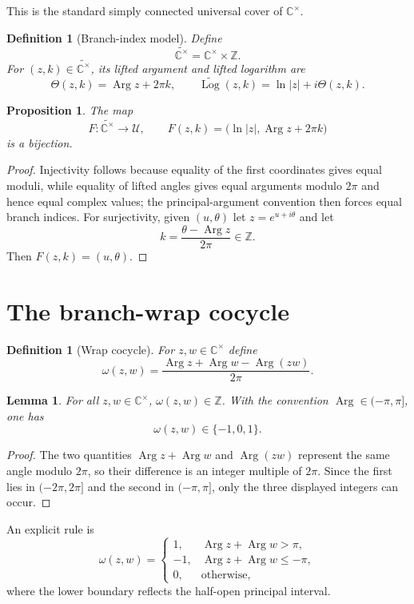 \documentclass[11pt]{article}
\newtheorem{proposition}[theorem]{Proposition}
\newtheorem{lemma}[theorem]{Lemma}
\newtheorem{definition}[theorem]{Definition}
\newcommand{\C}{\mathbb C}
\newcommand{\Z}{\mathbb Z}
\newcommand{\Argp}{\operatorname{Arg}}
\newcommand{\wtC}{\widetilde{\C^{\times}}}
\begin{document}
This is the standard simply connected universal cover of $\C^{\times}$.

\begin{definition}[Branch-index model]
Define
\[
\wtC=\C^{\times}\times\Z.
\]
For $(z,k)\in\wtC$, its lifted argument and lifted logarithm are
\[
\Theta(z,k)=\Argp z+2\pi k,
\qquad
\widetilde{\operatorname{Log}}(z,k)=\ln|z|+i\Theta(z,k).
\]
\end{definition}

\begin{proposition}
The map
\[
F:\wtC\longrightarrow\mathcal U,
\qquad
F(z,k)=\bigl(\ln|z|,\Argp z+2\pi k\bigr)
\]
is a bijection.
\end{proposition}

\begin{proof}
Injectivity follows because equality of the first coordinates gives equal moduli, while equality of lifted angles gives equal arguments modulo $2\pi$ and hence equal complex values; the principal-argument convention then forces equal branch indices.  For surjectivity, given $(u,\theta)$ let $z=e^{u+i\theta}$ and let
\[
k=\frac{\theta-\Argp z}{2\pi}\in\Z.
\]
Then $F(z,k)=(u,\theta)$.
\end{proof}

\section{The branch-wrap cocycle}

\begin{definition}[Wrap cocycle]
For $z,w\in\C^{\times}$ define
\[
\omega(z,w)=\frac{\Argp z+\Argp w-\Argp(zw)}{2\pi}.
\]
\end{definition}

\begin{lemma}
For all $z,w\in\C^{\times}$, $\omega(z,w)\in\Z$.  With the convention $\Argp\in(-\pi,\pi]$, one has
\[
\omega(z,w)\in\{-1,0,1\}.
\]
\end{lemma}

\begin{proof}
The two quantities $\Argp z+\Argp w$ and $\Argp(zw)$ represent the same angle modulo $2\pi$, so their difference is an integer multiple of $2\pi$.  Since the first lies in $(-2\pi,2\pi]$ and the second in $(-\pi,\pi]$, only the three displayed integers can occur.
\end{proof}

An explicit rule is
\[
\omega(z,w)=
\begin{cases}
 1,&\Argp z+\Argp w>\pi,\\
-1,&\Argp z+\Argp w\le -\pi,\\
 0,&\text{otherwise},
\end{cases}
\]
where the lower boundary reflects the half-open principal interval.
\end{document}

